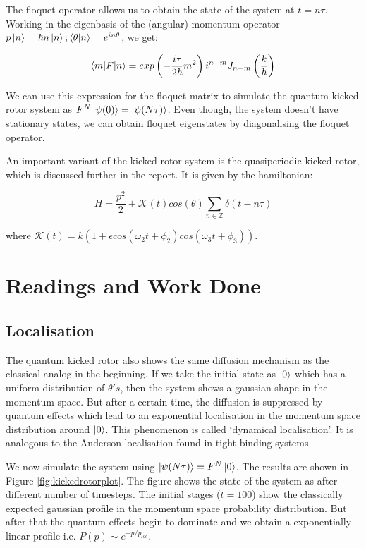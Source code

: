 \documentclass[twocolumn,nobalancelastpage]{report}
\begin{document}
The floquet operator allows us to obtain the state of the system at $t = n\tau$.
Working in the eigenbasis of the (angular) momentum operator
$p \ket{n} = \hbar n \ket{n}; \braket{\theta | n} = e^{in\theta}$, we get:

\begin{equation}
    \braket{m | F | n} = exp\left(-\frac{i \tau}{2\hbar}m^2\right) i^{n-m}
    J_{n-m}\left(\frac{k}{\hbar}\right)
\end{equation}

We can use this expression for the floquet matrix to simulate the quantum
kicked rotor system as $F^N \ket{\psi(0)} = \ket{\psi(N\tau)}$. Even though,
the system doesn't have stationary states, we can obtain floquet eigenstates
by diagonalising the floquet operator.

An important variant of the kicked rotor system is the quasiperiodic kicked
rotor, which is discussed further in the report. It is given by the
hamiltonian:

\begin{equation}
H = \frac{p^2}{2} + \mathcal{K}(t) cos(\theta)\sum_{n \in \mathbb{Z}}
\delta(t - n\tau)
\end{equation}

where $\mathcal{K}(t) = k(1 + \epsilon cos(\omega_2 t + \phi_2)
cos(\omega_3 t + \phi_3))$.

\chapter{Readings and Work Done}
\section{Localisation}
The quantum kicked rotor also shows the same diffusion mechanism as the
classical analog in the beginning. If we take the initial state as $\ket{0}$
which has a uniform distribution of $\theta's$, then the system shows a
gaussian shape in the momentum space. But after a certain time, the
diffusion is suppressed by quantum effects which lead to an exponential
localisation in the momentum space distribution around $\ket{0}$. This
phenomenon is called `dynamical localisation'. It is analogous to the
Anderson localisation found in tight-binding systems.

We now simulate the system using $\ket{\psi(N\tau)} = F^N \ket{0}$. The
results are shown in Figure \ref{fig:kickedrotorplot}. The figure shows the
state of the system as after different number of timesteps. The initial
stages ($t = 100$) show the classically expected gaussian profile in the
momentum space probability distribution. But after that the quantum effects
begin to dominate and we obtain a exponentially linear profile i.e. $P(p)
\sim e^{-p/p_{loc}}$.
\end{document}
